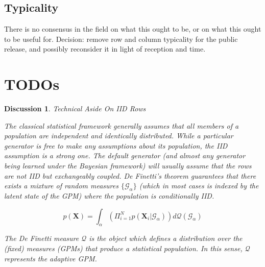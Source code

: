 \documentclass[10pt,letterpaper]{article}
\newtheorem{discussion}{Discussion}[section]
\newcommand{\set}[1]{\{#1\}}
\newcommand{\G}{\mathcal{G}}
\begin{document}
\subsection{Typicality}

There is no consensus in the field on what this ought to be, or on
what this ought to be useful for.  Decision: remove row and column
typicality for the public release, and possibly reconsider it in light
of reception and time.

\section{TODOs}




\begin{discussion} \label{disc:iid} Technical Aside On IID Rows

The classical statistical framework generally assumes that all members of a
population are independent and identically distributed. While a particular
generator is free to make any assumptions about its population, the IID
assumption is a strong one. The default generator (and almost any generator
being learned under the Bayesian framework) will usually assume that the rows
are not IID but exchangeably coupled. De Finetti's theorem guarantees that there
exists a mixture of random measures $\set{\G_\alpha}$ (which in most
cases is indexed by the latent state of the GPM) where the population is
conditionally IID.

$$p(\mathbf{X}) = \int_\alpha{(\Pi_{i=1}^Np(\mathbf{X}_i|\G_\alpha))d
\mathcal{Q}(\G_\alpha)}$$

The De Finetti measure $\mathcal{Q}$ is the object which defines a distribution
over the (fixed) measures (GPMs) that produce a statistical population. In this
sense, $\mathcal{Q}$ represents the adaptive GPM.

\end{discussion}
\end{document}
